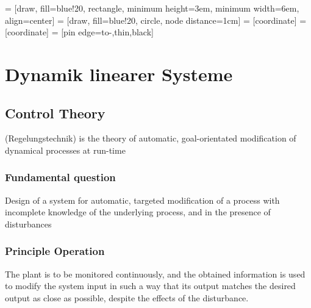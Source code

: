 

\newcommand{\resolvent}{\ensuremath{\Phi}\xspace}
\newcommand{\statetrans}{\ensuremath{\phi}\xspace}

 = [draw, fill=blue!20, rectangle, 
minimum height=3em, minimum width=6em, align=center]
 = [draw, fill=blue!20, circle, node distance=1cm]
 = [coordinate]
 = [coordinate]
 = [pin edge={to-,thin,black}]

\section{Dynamik linearer Systeme}%
\label{dls:sec:dynamik_linearer_systeme}

\subsection{Control Theory}%
\label{dls:sub:control_theory}
(Regelungstechnik) is the theory of automatic, goal-orientated modification of dynamical processes at run-time

\subsubsection{Fundamental question}%
\label{dls:ssub:fundamental_question}
Design of a system for automatic, targeted modification of a process with incomplete knowledge of the underlying
process, and in the presence of disturbances

\subsubsection{Principle Operation}%
\label{dls:ssub:principle_operation}
The plant is to be monitored continuously, and the obtained information is used to modify the system input in such a
way that its output matches the desired output as close as possible, despite the effects of the disturbance.


